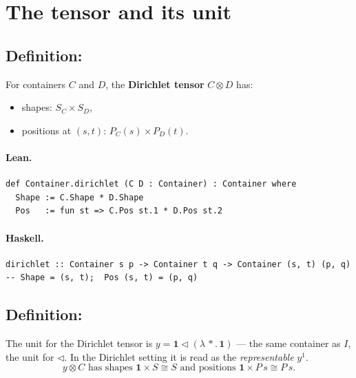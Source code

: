 \documentclass[11pt,a4paper]{article}
\begin{document}
\section{The tensor and its unit}

\subsection{Definition: }

\begin{defn}
For containers $C$ and $D$, the \textbf{Dirichlet tensor} $C \otimes D$ has:
\begin{itemize}
  \item shapes: $S_C \times S_D$,
  \item positions at $(s,t)$: $P_C(s) \times P_D(t)$.
\end{itemize}
\end{defn}

\paragraph{Lean.}
\begin{lstlisting}[style=lean]
def Container.dirichlet (C D : Container) : Container where
  Shape := C.Shape * D.Shape
  Pos   := fun st => C.Pos st.1 * D.Pos st.2
\end{lstlisting}

\paragraph{Haskell.}
\begin{lstlisting}[style=haskell]
dirichlet :: Container s p -> Container t q -> Container (s, t) (p, q)
-- Shape = (s, t);  Pos (s, t) = (p, q)
\end{lstlisting}


\subsection{Definition: }

\begin{defn}
The unit for the Dirichlet tensor is
$y = \mathbf{1} \triangleleft (\lambda\,\ast.\,\mathbf{1})$
--- the same container as $I$, the unit for $\triangleleft$.  In the Dirichlet
setting it is read as the \emph{representable} $y^1$.
\[
  y \otimes C \text{ has shapes } \mathbf{1} \times S \cong S
  \text{ and positions } \mathbf{1} \times P\,s \cong P\,s.
\]
\end{defn}
\end{document}
